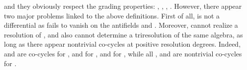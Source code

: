 \documentclass[a4paper,12pt]{article}
\begin{document}
and they obviously respect the grading properties: \coordHE{}, \coordHE{}, \coordHE{}, \coordHE{}. However, there appear two major
problems linked to the above definitions. First of all, \myHighlight{$\delta $}\coordHE{} is not a
differential as \coordHE{} fails to vanish on the antifields \coordHE{} and \coordHE{}. Moreover, \myHighlight{$%
\delta $}\coordHE{} cannot realize a resolution of \coordHE{},
and \coordHE{} also cannot determine a
triresolution of the same algebra, as long as there appear nontrivial
co-cycles at positive resolution degrees. Indeed, \coordHE{} and \coordHE{} are co-cycles for \coordHE{}, \coordHE{} and \coordHE{} for \coordHE{}, \coordHE{} and \coordHE{} for \coordHE{}, while all \coordHE{}, \coordHE{} and \coordHE{} are nontrivial co-cycles for \myHighlight{$\delta $}\coordHE{}.
\end{document}
